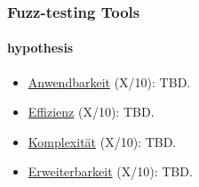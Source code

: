 \subsubsection{Fuzz-testing Tools}\label{zusammenfassung:fuzz}

\paragraph{hypothesis}\label{zusammenfassung:fuzz:hypothesis}\mbox{}
\newline
\begin{itemize}
    \item \underline{Anwendbarkeit} (X/10):\newline
    TBD.
    
    \item \underline{Effizienz} (X/10):\newline
    TBD.
    
    \item \underline{Komplexität} (X/10):\newline
    TBD.
    
    \item \underline{Erweiterbarkeit} (X/10):\newline
    TBD.
\end{itemize}